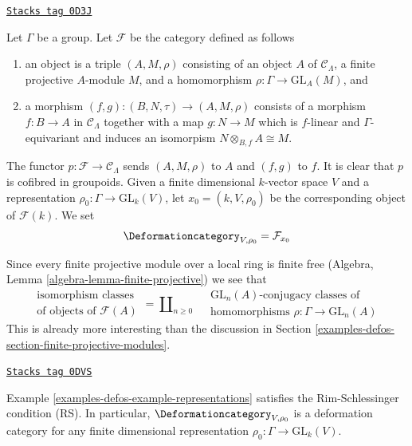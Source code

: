 \begin{example}

\label{examples-defos-example-representations}
\href{https://stacks.math.columbia.edu/tag/0D3J}{\texttt{Stacks tag 0D3J}}

Let $\Gamma$ be a group.
Let $\mathcal{F}$ be the category defined as follows
\begin{enumerate}
\item an object is a triple $(A, M, \rho)$ consisting of an
object $A$ of $\mathcal{C}_\Lambda$, a finite projective $A$-module $M$,
and a homomorphism $\rho : \Gamma \to \text{GL}_A(M)$, and
\item a morphism $(f, g) : (B, N, \tau) \to (A, M, \rho)$ consists of
a morphism $f : B \to A$ in $\mathcal{C}_\Lambda$ together
with a map $g : N \to M$ which is $f$-linear and $\Gamma$-equivariant
and induces an isomorpism $N \otimes_{B, f} A \cong M$.
\end{enumerate}
The functor $p : \mathcal{F} \to \mathcal{C}_\Lambda$ sends $(A, M, \rho)$
to $A$ and $(f, g)$ to $f$. It is clear that $p$ is cofibred in groupoids.
Given a finite dimensional $k$-vector space $V$ and a representation
$\rho_0 : \Gamma \to \text{GL}_k(V)$,
let $x_0 = (k, V, \rho_0)$ be the corresponding object of $\mathcal{F}(k)$.
We set
$$
\Deformationcategory_{V, \rho_0} = \mathcal{F}_{x_0}
$$
\end{example}

Since every finite projective module over a local ring is finite free
(Algebra, Lemma \ref{algebra-lemma-finite-projective})
we see that
$$
\begin{matrix}
\text{isomorphism classes} \\
\text{of objects of }\mathcal{F}(A)
\end{matrix}
=
\coprod\nolimits_{n \geq 0}\quad
\begin{matrix}
\text{GL}_n(A)\text{-conjugacy classes of}\\
\text{homomorphisms }\rho : \Gamma \to \text{GL}_n(A)
\end{matrix}
$$
This is already more interesting than the discussion in
Section \ref{examples-defos-section-finite-projective-modules}.

\begin{lemma}[Representations RS]
\label{examples-defos-lemma-representations-RS}
\href{https://stacks.math.columbia.edu/tag/0DVS}{\texttt{Stacks tag 0DVS}}

Example \ref{examples-defos-example-representations}
satisfies the Rim-Schlessinger condition (RS).
In particular, $\Deformationcategory_{V, \rho_0}$ is a deformation category
for any finite dimensional representation
$\rho_0 : \Gamma \to \text{GL}_k(V)$.
\end{lemma}


